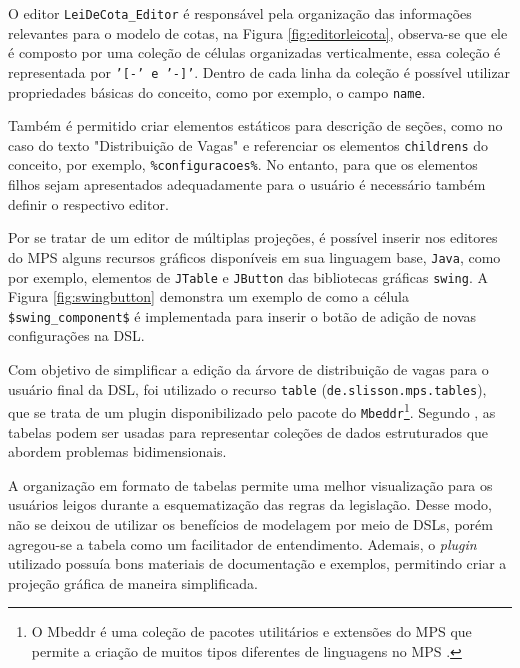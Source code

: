 O editor \texttt{LeiDeCota\_Editor} é responsável pela organização das informações relevantes para o modelo de cotas, na Figura \ref{fig:editorleicota}, observa-se que ele é composto por uma coleção de células organizadas verticalmente, essa coleção é representada por \texttt{'[-' e '-]'}. Dentro de cada linha da coleção é possível utilizar propriedades básicas do conceito, como por exemplo, o campo \texttt{name}. 




\newpage
Também é permitido criar elementos estáticos para descrição de seções, como no caso do texto "Distribuição de Vagas" e referenciar os elementos \texttt{childrens} do conceito, por exemplo, \texttt{\%configuracoes\%}. No entanto, para que os elementos filhos sejam apresentados adequadamente para o usuário é necessário também definir o respectivo editor. 

Por se tratar de um editor de múltiplas projeções, é possível inserir nos editores do \gls{MPS} alguns recursos gráficos disponíveis em sua linguagem base, \texttt{Java}, como por exemplo, elementos de \texttt{JTable} e \texttt{JButton} das bibliotecas gráficas \texttt{swing}. A Figura \ref{fig:swingbutton} demonstra um exemplo de como a célula \texttt{\$swing\_component\$} é implementada para inserir o botão de adição de novas configurações na DSL.



Com objetivo de simplificar a edição da árvore de distribuição de vagas para o usuário final da DSL, foi utilizado o recurso \texttt{table} (\texttt{de.slisson.mps.tables}), que se trata de um plugin disponibilizado pelo pacote do \texttt{Mbeddr}\footnote{O Mbeddr é uma coleção de pacotes utilitários e extensões do MPS que permite a criação de muitos tipos diferentes de linguagens no \gls{MPS} \cite{mbeddr}.}. Segundo , as tabelas podem ser usadas para representar coleções de dados estruturados que abordem problemas bidimensionais. 

A organização em formato de tabelas permite uma melhor visualização para os usuários leigos durante a esquematização das regras da legislação. Desse modo, não se deixou de utilizar os benefícios de modelagem por meio de \gls{DSL}s, porém agregou-se a tabela como um facilitador de entendimento. Ademais, o \textit{plugin} utilizado possuía bons materiais de documentação e exemplos, permitindo criar a projeção gráfica de maneira simplificada. 

